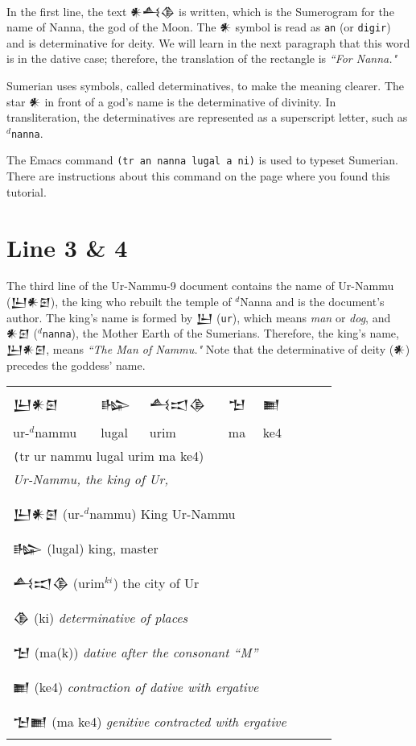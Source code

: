 \documentclass[a4paper,12pt]{book}
\newcommand{\fcn}{\setmainfont{Akkadian.otf}}
\begin{document}
\verb||\\
 In the first line,
the text {\fcn 𒀭𒋀𒆠} is written, which is
the Sumerogram for the name of Nanna, the god of the Moon.
The {\fcn 𒀭} symbol is read as \verb|an|
(or \verb|digir|) and is determinative for deity.
We will learn in the next paragraph that this word
is in the dative case; therefore, the translation
of the rectangle is {\em ``For Nanna."}

Sumerian uses symbols, called determinatives,
to make the meaning clearer. The star {\fcn 𒀭}
in front of a god's name is the determinative
of divinity. In transliteration, the determinatives
are represented as a superscript letter, such
as $^d$\verb|nanna|.

The Emacs command \verb|(tr an nanna lugal a ni)| is used
to typeset Sumerian. There are instructions about
this command on the page where you found this tutorial.

\section{Line 3 \& 4}
The third line of the Ur-Nammu-9 document contains the name of
Ur-Nammu ({\fcn 𒌨𒀭𒇉}), the king who rebuilt the temple
of $^d$Nanna and is the document's author.
The king's name is formed by {\fcn 𒌨} (\verb|ur|),
which means {\em man} or {\em dog},
and {\fcn 𒀭𒇉} ($^d$\verb|nanna|),
the Mother Earth of the Sumerians.
Therefore, the king's name, {\fcn 𒌨𒀭𒇉},
means {\em ``The Man of Nammu."}
Note that the determinative of
deity ({\fcn 𒀭}) precedes the goddess' name.\\

\begin{tabular}[!h]{l l l l l l l l}
\fcn\Large 𒌨𒀭𒇉
&\fcn\Large 𒈗 &\fcn\Large 𒋀𒀊𒆠 &
\fcn\Large 𒈠 & \fcn\Large 𒆤\\
  ur-$^d$nammu & lugal & urim & ma & ke4\\
\multicolumn{5}{l}{\texttt (tr ur nammu lugal urim ma ke4)}\\
\multicolumn{5}{l}{\em Ur-Nammu, the king of Ur,}\\
\hline\\
\multicolumn{5}{l}{{\fcn 𒌨𒀭𒇉}
                    (ur-$^d$nammu) King Ur-Nammu}\\
\multicolumn{5}{l}{{\fcn 𒈗}
                    (lugal) king, master }\\
\multicolumn{5}{l}{{\fcn 𒋀𒀊𒆠}
                    (urim$^{ki}$) the city of Ur }\\
\multicolumn{5}{l}{{\fcn 𒆠}
     (ki) {\em determinative of places} }\\
\multicolumn{5}{l}{{\fcn 𒈠}
     (ma(k)) {\em dative after the consonant ``M''} }\\
\multicolumn{5}{l}{{\fcn 𒆤}
     (ke4) {\em contraction of dative with ergative} }\\
\multicolumn{5}{l}{{\fcn 𒈠𒆤}
     (ma ke4) {\em genitive contracted with ergative} }\\
\end{tabular} 
\end{document}
